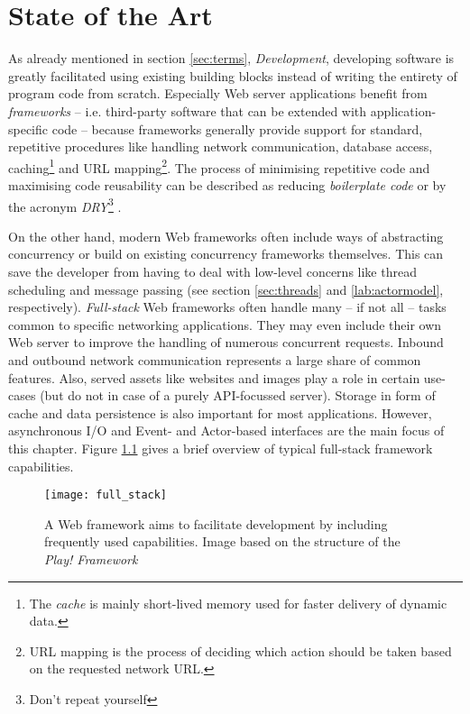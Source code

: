 \chapter{State of the Art}
\label{lab:sota}
As already mentioned in section \ref{sec:terms}, \textit{Development}, developing software is greatly facilitated using existing building blocks instead of writing the entirety of program code from scratch. Especially Web server applications benefit from \textit{frameworks} -- i.e. third-party software that can be extended with application-specific code -- because frameworks generally provide support for standard, repetitive procedures like handling network communication, database access, caching\footnote{The \textit{cache} is mainly short-lived memory used for faster delivery of dynamic data.} and URL mapping\footnote{URL mapping is the process of deciding which action should be taken based on the requested network URL.}. The process of minimising repetitive code and maximising code reusability can be described as reducing \textit{boilerplate code} or by the acronym \textit{DRY}\footnote{Don't repeat yourself} \cite[p. 149]{Scala} \cite[p. 1]{Orsini2008}.

On the other hand, modern Web frameworks often include ways of abstracting concurrency or build on existing concurrency frameworks themselves. This can save the developer from having to deal with low-level concerns like thread scheduling and message passing (see section \ref{sec:threads} and \ref{lab:actormodel}, respectively). \textit{Full-stack} Web frameworks often handle many -- if not all -- tasks common to specific networking applications. They may even include their own Web server to improve the handling of numerous concurrent requests. Inbound and outbound network communication represents a large share of common features. Also, served assets like websites and images play a role in certain use-cases (but do not in case of a purely API-focussed server). Storage in form of cache and data persistence is also important for most applications. However, asynchronous I/O and Event- and Actor-based interfaces are the main focus of this chapter. Figure \ref{fig:full_stack} gives a brief overview of typical full-stack framework capabilities. 

\begin{figure}
\centering\small
\setlength{\tabcolsep}{0mm}
  \texttt{[image: full\_stack]}
\caption{
A Web framework aims to facilitate development by including frequently used capabilities. Image based on the structure of the \textit{Play! Framework} \cite{Scala}
}
\label{fig:full_stack}
\end{figure}

